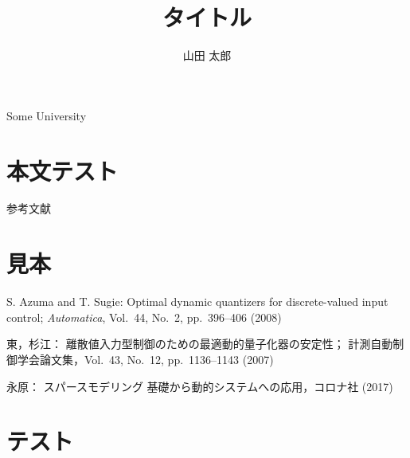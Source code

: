 \documentclass[J,amsmath]{scitrans}
\begin{document}
    \title{タイトル}
    \author{山田 太郎}

    \maketitle
    \address{*}{\AcceptDate}
    \address{**}{Some University}

    \section*{本文テスト}
        参考文献\cite{azuma2008optimal,東俊一2007離散値入力型制御のための最適動的量子化器の安定性,永原正章2017-10-06}

    \section*{見本}
        \begin{thebibliography}{9}
            S. Azuma and T. Sugie:
            Optimal dynamic quantizers for discrete-valued input control;
            {\it Automatica}, Vol.~44, No.~2, pp.~396--406 (2008)

            東，杉江：
            離散値入力型制御のための最適動的量子化器の安定性；
            計測自動制御学会論文集，Vol.~43, No.~12, pp.~1136--1143 (2007)

            永原：
            スパースモデリング 基礎から動的システムへの応用，コロナ社 (2017)


        \end{thebibliography}

    \section*{テスト}
        
        
\end{document}
